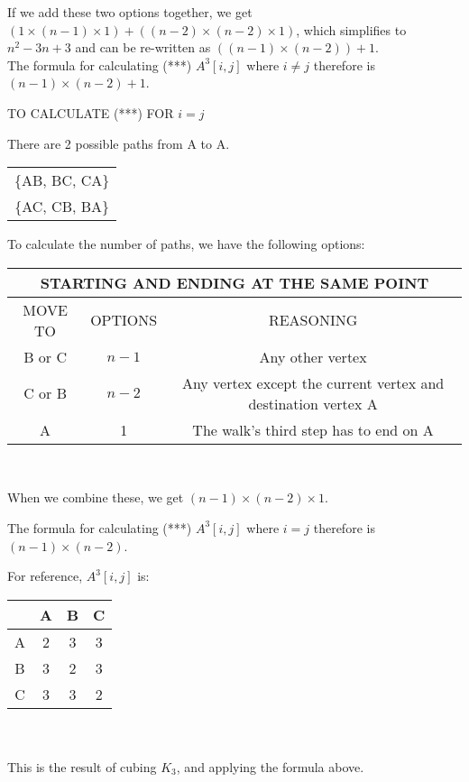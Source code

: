 \documentclass[12pt]{article}
\begin{document}
If we add these two options together, we get $(1 \times (n-1) \times 1) +  ((n-2) \times (n-2) \times 1)$, which simplifies to $n^{2} - 3n +3$ and can be re-written as $((n-1) \times (n-2)) + 1$. \\


The formula for calculating (***) $A^{3}[i, j]$ where $i \neq j$ therefore is $(n-1) \times (n-2) + 1$.

\begin{center}
\Large TO CALCULATE (***) FOR $i = j$
\end{center}
\normalsize

There are 2 possible paths from A to A. \\
\begin{center}
\begin{tabular}{|c|}  \hline
\{AB, BC, CA\} \\
\{AC, CB, BA\} \\ \hline
\end{tabular}
\end{center}

To calculate the number of paths, we have the following options: \\
\begin{center}
\begin{tabular}{|c|c|c|}
\multicolumn{3}{c}{STARTING AND ENDING AT THE SAME POINT}  \\ \hline
MOVE TO & OPTIONS & REASONING \\ \hline
B or C & $n-1$ & Any other vertex\\ \hline
C or B &$n-2$ & Any vertex except the current vertex and destination vertex A \\ \hline
A & 1 & The walk's third step has to end on A \\ \hline
\end{tabular} \\
\end{center}

When we combine these, we get $(n-1) \times (n-2) \times 1$.

The formula for calculating (***) $A^{3}[i, j]$ where $i = j$ therefore is $(n-1) \times (n-2)$.

For reference, $A^{3}[i,j]$ is:
\begin{tabular}{|c|c|c|c|} \hline
 & A & B & C \\ \hline
 A & 2 & 3 & 3 \\ \hline
 B & 3 & 2 & 3 \\ \hline
 C & 3 & 3 & 2 \\ \hline
 \end{tabular} \\ \\
 This is the result of cubing $K_3$, and applying the formula above. \\
\end{document}
